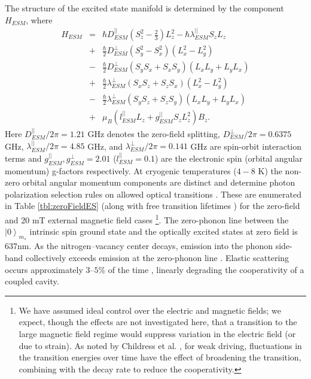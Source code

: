 \documentclass[aps,pra,amsmath,amssymb,reprint,superscriptaddress,tightenlines]{revtex4-1}
\begin{document}
The structure of the excited state manifold is determined by the component $H_{ESM}$, where
\begin{eqnarray}
	H_{ESM} &=& \hbar D^{||}_{ESM} \left( S^{2}_{z} - \frac{2}{3} \right)L^{2}_{z} - \hbar \lambda^{||}_{ESM} S_{z} L_{z} \nonumber \\
	&+&\frac{\hbar}{2} D^{\perp}_{ESM} \left( S^{2}_{y} - S^{2}_{x} \right) \left( L^{2}_{x} - L^{2}_{y} \right)\nonumber \\
	&-& \frac{\hbar}{2} D^{\perp}_{ESM} \left( S_{y}S_{x} + S_{x}S_{y} \right) \left( L_{x}L_{y} + L_{y}L_{x} \right)\nonumber\\
	&+&\frac{\hbar}{2} \lambda^{\perp}_{ESM}\left( S_{x}S_{z} + S_{z}S_{x} \right) \left( L^{2}_{x} - L^{2}_{y} \right) \nonumber \\
	&-&\frac{\hbar}{2} \lambda^{\perp}_{ESM}\left( S_{y}S_{z} + S_{z}S_{y} \right) \left( L_{x}L_{y} + L_{y}L_{x} \right)  \nonumber \\
        &+& \mu_{B} \left( l^{||}_{ESM} L_{z} + g^{||}_{ESM} S_{z}L^{2}_{z} \right) B_{z}.
	\label{eqn:HamESM}
\end{eqnarray}
Here ${D^{||}_{ESM}}/{2\pi}=1.21$ GHz denotes the zero-field splitting, ${D^{\perp}_{ESM}}/{2\pi}=0.6375$ GHz, ${\lambda^{||}_{ESM}}/{2\pi}=4.85$ GHz, and ${\lambda^{\perp}_{ESM}}/{2\pi}=0.141$ GHz are spin-orbit interaction terms and $g^{||}_{ESM},g^{\perp}_{ESM}=2.01$ ($l^{||}_{ESM}=0.1$) are the electronic spin (orbital angular momentum) g-factors respectively. At cryogenic temperatures ($4-8$ K) the non-zero orbital angular momentum components are distinct \cite{Tamarat06,Batalov09} and determine photon polarization selection rules on allowed optical transitions \cite{Chu15}. These are enumerated in Table \ref{tbl:zeroFieldES} (along with free transition lifetimes \cite{Goldman15,Collins83}) for the zero-field and 20 mT external magnetic field cases \footnote{We have assumed ideal control over the electric and magnetic fields; we expect, though the effects are not investigated here, that a transition to the large magnetic field regime would suppress variation in the electric field (or due to strain). As noted by Childress et al. \cite{Childress05}, for weak driving, fluctuations in the transition energies over time have the effect of broadening the transition, combining with the decay rate to reduce the cooperativity.}. The zero-phonon line between the $\left|0\right>_{m_{s}}$ intrinsic spin ground state and the optically excited states at zero field is $637$nm. As the nitrogen--vacancy center decays,  emission into the phonon side-band collectively exceeds emission at the zero-phonon line  \cite{Davies74,Davies76,Kehayias13}. Elastic scattering occurs approximately $3$--$5$\% of the time \cite{Jelezko02,Santori10,Albrecht14,Johnson15}, linearly degrading the cooperativity of a coupled cavity.
\end{document}
